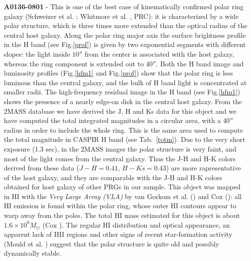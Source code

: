 \documentclass{aa}
\begin{document}
{\bf A0136-0801} - 
This is one of the best case of kinematically confirmed polar ring galaxy 
(Schweizer et al. \cite{Schweizer83}; Whitmore et al. \cite{PRC}, PRC): 
it is characterized by a wide polar structure, which is
three times more extended than the optical radius of the central host  
galaxy. 
Along the polar ring major axis the surface brightness profile in the H
band (see Fig.\ref{prof}) is given by two exponential segments 
with different slopes: 
the light inside $10''$ from the center is associated with the host
galaxy, whereas the ring component is extended out to $40''$. Both the H
band image and luminosity profiles (Fig.\ref{hfm1} and
Fig.\ref{prof}) show that
the polar ring is less luminous than the central galaxy, and the bulk of H 
band light is concentrated at smaller radii. The high-frequency residual image 
in the H band (see Fig.\ref{hfm1}) shows the presence of a nearly edge-on 
disk in the central host galaxy.
From the 2MASS database we have derived the J, H and Ks data for this
object and we have computed the total integrated magnitudes in a circular
area, with a $40''$ radius in order to include the whole ring.
This is the same area used to compute the total magnitude in CASPIR H band
(see Tab.~\ref{totm}). Due to the very short exposure (1.3 sec), in the 2MASS
images the polar structure is very faint, and most of the light comes from
the central galaxy. Thus the J-H and H-K colors derived from these data
($J-H=0.41$, $H-Ks=0.43$) are more rapresentative of the host galaxy,
and they are comparable with the J-H and H-K colors obtained for
host galaxy of other PRGs in our sample.
This object was mapped in HI with the {\it Very Large Array (VLA)} by 
van Gorkom et al. (\cite{vgorkom87}) and Cox (\cite{Cox96}): 
all HI emission is found within the polar ring, whose outer HI contours
appear to warp away from the poles.
The total HI mass estimated for this object is about 
$1.6 \times 10^9 M_{\odot}$ (Cox \cite{Cox96}).
The regular HI distribution and optical appearance, an apparent lack of HII 
regions and  other signs of recent star-formation activity (Mould et
al. \cite{Mould82}) suggest that the polar structure is quite old and
possibly dynamically stable.

\bigskip
\end{document}
